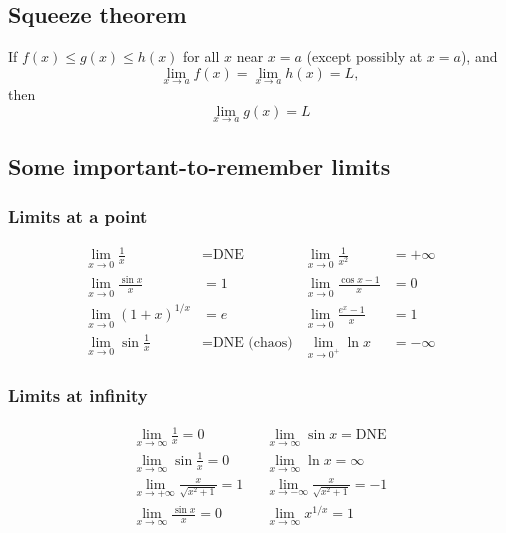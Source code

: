 \documentclass[main.tex]{subfiles}
\begin{document}
	\subsection*{Squeeze theorem}
	\begin{theorem}
	If \(f(x) \leq g(x) \leq h(x)\) for all \(x\) near \(x = a\) (except possibly at \(x = a\)), and
	\[\lim_{x \to a}{f(x)} = \lim_{x \to a}{h(x)} = L,\] then \[\lim_{x \to a}{g(x)} = L\]
	\end{theorem}

	\subsection*{Some important-to-remember limits}
	\subsubsection*{Limits at a point}
	\begin{align*}  %
		\lim_{x \to 0} \frac{1}{x} &= \text{DNE} & \lim_{x \to 0} \frac{1}{x^2} &= +\infty \\
		\lim_{x \to 0} \frac{\sin{x}}{x} &= 1 & \lim_{x \to 0} \frac{\cos{x} - 1}{x} &= 0 \\
		\lim_{x \to 0} (1 + x)^{1/x} &= e & \lim_{x \to 0} \frac{e^x - 1}{x} &= 1 \\
		\lim_{x \to 0} \sin{\frac{1}{x}} &= \text{DNE (chaos)} & \lim_{x \to 0^{+}} \ln{x} &= -\infty
	\end{align*}
	\subsubsection*{Limits at infinity}
	\begin{align*}
		\lim_{x \to \infty} \frac{1}{x} = 0 && \lim_{x \to \infty} \sin{x} = \text{DNE} \\
		\lim_{x \to \infty} \sin{\frac{1}{x}} = 0 && \lim_{x \to \infty} \ln{x} = \infty \\
		\lim_{x \to +\infty} \frac{x}{\sqrt{x^2 + 1}} = 1 && \lim_{x \to -\infty} \frac{x}{\sqrt{x^2 + 1}} = -1 \\
		\lim_{x \to \infty} \frac{\sin{x}}{x} = 0 && \lim_{x \to \infty} x^{1/x} = 1
	\end{align*}
\ifSubfilesClassLoaded{%
\end{multicols}
}{}
\end{document}
